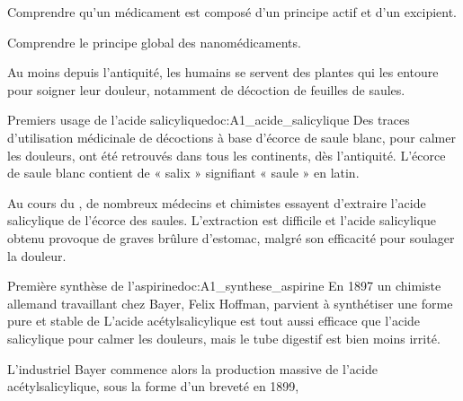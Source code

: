 \teteTermStssMedi


\begin{objectifs}
  \item Comprendre qu'un médicament est composé d'un principe actif et d'un excipient.
  \item Comprendre le principe global des nanomédicaments.
\end{objectifs}

\begin{contexte}
  Au moins depuis l'antiquité, les humains se servent des plantes qui les entoure pour soigner leur douleur, notamment de décoction de feuilles de saules.
  
\end{contexte}


\begin{doc}{Premiers usage de l'acide salicylique}{doc:A1_acide_salicylique}
  Des traces d'utilisation médicinale de décoctions à base d'écorce de saule blanc, pour calmer les douleurs, ont été retrouvés dans tous les continents, dès l'antiquité.
  L'écorce de saule blanc contient de  « salix » signifiant « saule » en latin.

  Au cours du \!, de nombreux médecins et chimistes essayent d'extraire l'acide salicylique de l'écorce des saules. 
  L'extraction est difficile et l'acide salicylique obtenu provoque de graves brûlure d'estomac, malgré son efficacité pour soulager la douleur.
\end{doc}

\begin{doc}{Première synthèse de l'aspirine}{doc:A1_synthese_aspirine}
  En 1897 un chimiste allemand travaillant chez Bayer, Felix Hoffman, parvient à synthétiser une forme pure et stable de
  L'acide acétylsalicylique est tout aussi efficace que l'acide salicylique pour calmer les douleurs, mais le tube digestif est bien moins irrité.

  L'industriel Bayer commence alors la production massive de l'acide acétylsalicylique, sous la forme d'un  breveté en 1899, 
\end{doc}

